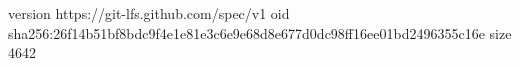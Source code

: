 version https://git-lfs.github.com/spec/v1
oid sha256:26f14b51bf8bdc9f4e1e81e3c6e9e68d8e677d0dc98ff16ee01bd2496355c16e
size 4642
